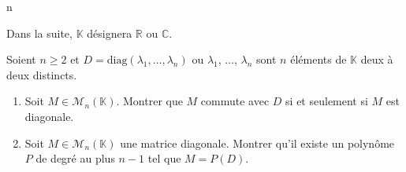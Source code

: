 n\documentclass[a4paper,10pt]{report}
\begin{document}
\everymath{\displaystyle}

\begin{center}
\end{center}


\bigskip

\noindent Dans la suite, $\mathbb{K}$ désignera $\mathbb{R}$ ou $\mathbb{C}$.

\medskip

\begin{Exercice}{} Soient $n \geq 2$ et $D= \textrm{diag}(\lambda_1, \ldots, \lambda_n)$ ou $\lambda_1$, $\ldots$, $\lambda_n$ sont $n$ éléments de $\mathbb{K}$ deux à deux distincts.
\begin{enumerate}
\item Soit $M \in \mathcal{M}_n(\mathbb{K})$. Montrer que $M$ commute avec $D$ si et seulement si $M$ est diagonale.
\item Soit $M \in \mathcal{M}_n(\mathbb{K})$ une matrice diagonale. Montrer qu'il existe un polynôme $P$ de degré au plus $n-1$ tel que $M=P(D)$.
\end{enumerate}
\end{Exercice}
\end{document}
